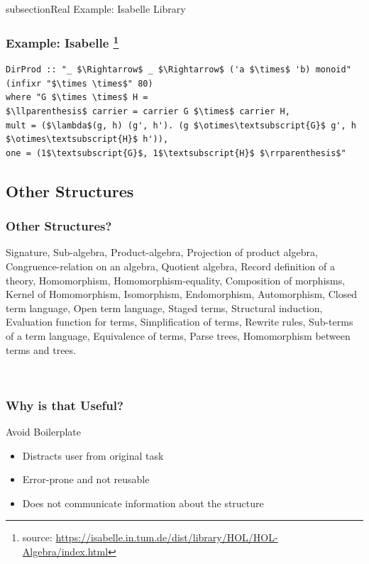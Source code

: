 \documentclass[t,12pt,numbers,fleqn,usenames,xcolor=dvipsnames]{beamer}
\begin{document}
subsection{Real Example: Isabelle Library}
\begin{frame}[fragile]
\frametitle{Example: Isabelle \footnote{\tiny{source: \url{https://isabelle.in.tum.de/dist/library/HOL/HOL-Algebra/index.html}}}}
\scriptsize
\begin{lstlisting}
DirProd :: "_ $\Rightarrow$ _ $\Rightarrow$ ('a $\times$ 'b) monoid" (infixr "$\times \times$" 80) 
where "G $\times \times$ H =
$\llparenthesis$ carrier = carrier G $\times$ carrier H,
mult = ($\lambda$(g, h) (g', h'). (g $\otimes\textsubscript{G}$ g', h $\otimes\textsubscript{H}$ h')),
one = (1$\textsubscript{G}$, 1$\textsubscript{H}$ $\rrparenthesis$"
\end{lstlisting}


\end{frame}

\subsection{Other Structures}
\begin{frame}
\frametitle{Other Structures?}
\vspace{0.15cm}
{\scriptsize
	Signature, Sub-algebra, Product-algebra, Projection of product algebra, Congruence-relation on 
	an algebra, Quotient algebra, Record definition of a theory, Homomorphism, 
	Homomorphism-equality, Composition of morphisms, Kernel of Homomorphism, Isomorphism, 
	Endomorphism, Automorphism, Closed term language, Open term language, Staged terms, 
	Structural induction, Evaluation function for terms, Simplification of terms, Rewrite rules, 
	Sub-terms of a term language, Equivalence of terms, Parse trees, Homomorphism between 
	terms and trees. 
}

\vspace{0.3cm}
\pause
{}
\
\end{frame}

\begin{frame}
\frametitle{Why is that Useful?}
Avoid Boilerplate 
\begin{itemize}
	\item Distracts user from original task 
	\item Error-prone and not reusable 
	\item Does not communicate information about the structure 
\end{itemize}
\end{frame}
\end{document}
